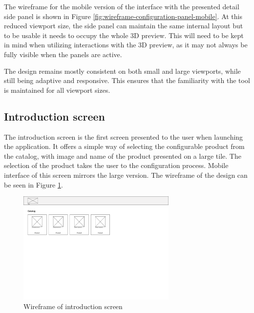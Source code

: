 The wireframe for the mobile version of the interface with the presented detail side panel is shown in Figure \ref{fig:wireframe-configuration-panel-mobile}. At this reduced viewport size, the side panel can maintain the same internal layout but to be usable it needs to occupy the whole 3D preview. This will need to be kept in mind when utilizing interactions with the 3D preview, as it may not always be fully visible when the panels are active. 

The design remains mostly consistent on both small and large viewports, while still being adaptive and responsive. This ensures that the familiarity with the tool is maintained for all viewport sizes.

\subsection{Introduction screen}

The introduction screen is the first screen presented to the user when launching the application. It offers a simple way of selecting the configurable product from the catalog, with image and name of the product presented on a large tile. The selection of the product takes the user to the configuration process. Mobile interface of this screen mirrors the large version. The wireframe of the design can be seen in Figure \ref{fig:wireframe-introduction}.

\begin{figure}[h]
\centering
\includegraphics[width=0.7\textwidth]{images/wireframe_introduction_default.png}
\caption{Wireframe of introduction screen}
\label{fig:wireframe-introduction}
\end{figure}

